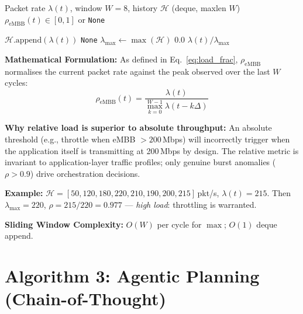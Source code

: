 \begin{algorithm}[H]
\caption{eMBB Load Fraction with Sliding Window}
\label{alg:loadfrac}
\begin{algorithmic}[1]
\Require Packet rate $\lambda(t)$, window $W = 8$, history $\mathcal{H}$ (deque, maxlen $W$)
\Ensure $\rho_{\text{eMBB}}(t) \in [0,1]$ or \texttt{None}

\State $\mathcal{H}.\text{append}(\lambda(t))$
 
  \Return \texttt{None}
\EndIf
\State $\lambda_{\max} \gets \max(\mathcal{H})$
  \Return $0.0$ 
\EndIf
\Return $\lambda(t) / \lambda_{\max}$
\end{algorithmic}
\end{algorithm}

\textbf{Mathematical Formulation:} As defined in Eq.~\ref{eq:load_frac}, $\rho_{\text{eMBB}}$ normalises the current packet rate against the peak observed over the last $W$ cycles:
\[
  \rho_{\text{eMBB}}(t) = \frac{\lambda(t)}{\max_{k=0}^{W-1} \lambda(t - k\Delta)}
\]

\textbf{Why relative load is superior to absolute throughput:} An absolute threshold (e.g., throttle when eMBB $> 200$\,Mbps) will incorrectly trigger when the application itself is transmitting at 200\,Mbps by design. The relative metric is invariant to application-layer traffic profiles; only genuine burst anomalies ($\rho > 0.9$) drive orchestration decisions.

\textbf{Example:} $\mathcal{H} = [50, 120, 180, 220, 210, 190, 200, 215]$\,pkt/s, $\lambda(t) = 215$. Then $\lambda_{\max} = 220$, $\rho = 215/220 = 0.977$ — \textit{high load}: throttling is warranted.

\textbf{Sliding Window Complexity:} $O(W)$ per cycle for $\max$; $O(1)$ deque append.

\section{Algorithm 3: Agentic Planning (Chain-of-Thought)}

